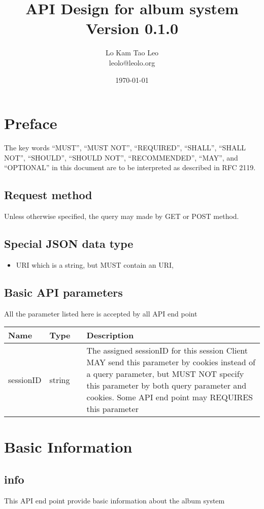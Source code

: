 \documentclass[a4paper,12pt]{report}
\title{API Design for album system Version 0.1.0}
\author{Lo Kam Tao Leo\\leolo@leolo.org}
\date{\today}
\begin{document}
	\maketitle
	\tableofcontents
	\chapter{Preface}
	The key words ``MUST'', ``MUST NOT'', ``REQUIRED'', ``SHALL'', ``SHALL
	NOT'', ``SHOULD'', ``SHOULD NOT'', ``RECOMMENDED'',  ``MAY'', and
	``OPTIONAL'' in this document are to be interpreted as described in
	RFC 2119.
	\section{Request method}
	Unless otherwise specified, the query may made by GET or POST method.
	\section{Special JSON data type}
	\begin{itemize}
		\item \label{type:URI}URI which is a string, but MUST contain an URI, 
	\end{itemize}
	\section{Basic API parameters}
	All the parameter listed here is accepted by all API end point
	
	\begin{tabular}{|l|ll|p{10cm}|}
		\hline
		Name & Type & & Description\\\hline
		sessionID & string &  & The assigned sessionID for this session\newline
		Client MAY send this parameter by cookies instead of a query parameter, but MUST NOT specify this parameter by both query parameter and cookies.\newline
		Some API end point may REQUIRES this parameter\\\hline
	\end{tabular}
	
	\chapter{Basic Information}
	\section{info}
	This API end point provide basic information about the album system
\end{document}
